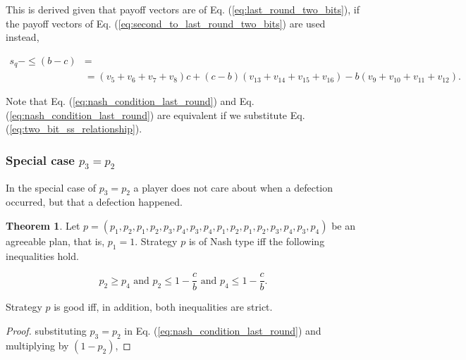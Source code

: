 \documentclass{article}
\theoremstyle{definition}
\newtheorem{theorem}{Theorem}[section]
\begin{document}
This is derived given that payoff vectors are of Eq. (\ref{eq:last_round_two_bits}),
if the payoff vectors of Eq. (\ref{eq:second_to_last_round_two_bits}) are used instead,


\begin{align}\label{eq:nash_condition_second_to_last_round}
  s_{q} - \leq (b - c) & = \\ \nonumber
  &= (v_{5} + v_{6} + v_{7} + v_{8}) c + (c - b) (v_{13} + v_{14} + v_{15} + v_{16}) - b (v_{9} + v_{10} + v_{11} + v_{12}).
\end{align}

Note that Eq. (\ref{eq:nash_condition_last_round}) and Eq.
(\ref{eq:nash_condition_last_round}) are equivalent if we substitute Eq.
(\ref{eq:two_bit_ss_relationship}).

\subsubsection{Special case \(p_3 = p_2\)}

In the special case of \(p_3 = p_2\) a player does not care about when a
defection occurred, but that a defection happened.

\begin{theorem}
Let \(p = (p_{1}, p_{2}, p_{1}, p_{2}, p_{3}, p_{4}, p_{3}, p_{4}, p_{1}, p_{2}, p_{1}, p_{2}, p_{3}, p_{4}, p_{3}, p_{4})\)
be an agreeable plan, that is, \(p_1 = 1\). Strategy \(p\) is of Nash type iff
the following inequalities hold.

\begin{equation*}
  p_2 \geq p_4 \text{ and } p_2 \leq 1 - \frac{c}{b} \text{ and } p_4 \leq 1 - \frac{c}{b}.
\end{equation*}

Strategy \(p\) is good iff, in addition, both inequalities are strict.
\end{theorem}

\begin{proof}

substituting \(p_3 = p_2\) in Eq. (\ref{eq:nash_condition_last_round}) and multiplying
by \((1 - p_2)\),


  
\end{proof}


\end{document}
